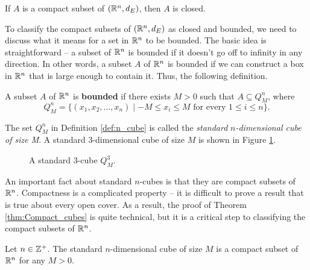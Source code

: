 \begin{corollary} If $A$ is a compact subset of $(\mathbb{R}^n, d_E)$, then $A$ is closed.
\end{corollary}


To classify the compact subsets of $(\mathbb{R}^n, d_E)$ as closed and bounded, we need to discuss what it means for a set in $\mathbb{R}^n$ to be bounded. The basic idea is straightforward -- a subset of $\mathbb{R}^n$ is bounded if it doesn't go off to infinity in any direction. In other words, a subset $A$ of $\mathbb{R}^n$ is bounded if we can construct a box in $\mathbb{R}^n$ that is large enough to contain it. Thus, the following definition.

\begin{definition} \label{def:n_cube} A subset $A$ of $\mathbb{R}^n$ is \textbf{bounded} if there exists $M > 0$ such that $A \subseteq Q^n_M$, where 
\[Q^n_M = \{(x_1,x_2, \ldots, x_n) \mid -M \leq x_i \leq M \text{ for every } 1 \leq i \leq n\}.\]
\end{definition}

The set $Q^n_M$ in Definition \ref{def:n_cube} is called the \emph{standard} $n$\emph{-dimensional cube of size M}.  A standard 3-dimensional cube of size $M$ is shown in Figure \ref{F:M_cube}.
\begin{figure}[h]
\begin{center}
\caption{A standard 3-cube $Q^3_M$.} 
\label{F:M_cube}
\end{center}
\end{figure}


An important fact about standard $n$-cubes is that they are compact subsets of $\mathbb{R}^n$. Compactness is a complicated property -- it is difficult to prove a result that is true about every open cover. As a result, the proof of Theorem \ref{thm:Compact_cubes} is quite technical, but it is a critical step to classifying the compact subsets of $\mathbb{R}^n$. 

\begin{theorem} \label{thm:Compact_cubes} Let $n \in \mathbb{Z}^+$. The standard $n$-dimensional cube of size $M$ is a compact subset of $\mathbb{R}^n$ for any $M > 0$. 
\end{theorem}

